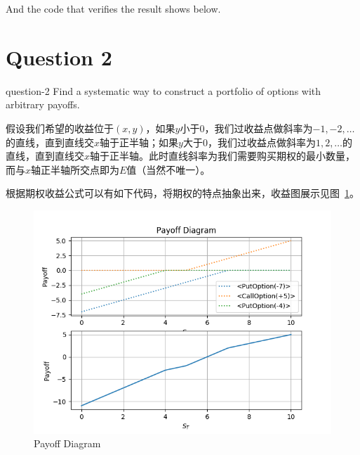 And the code that verifies the result shows below.



\section{Question 2}
\begin{statebox}{}{question-2}
    Find a systematic way to construct a portfolio of options with arbitrary payoffs.
\end{statebox}
假设我们希望的收益位于$(x,y)$，如果$y$小于0，我们过收益点做斜率为$-1,-2,\ldots$的直线，直到直线交$x$轴于正半轴；如果$y$大于0，我们过收益点做斜率为$1,2,\ldots$的直线，直到直线交$x$轴于正半轴。此时直线斜率为我们需要购买期权的最小数量，而与$x$轴正半轴所交点即为$E$值（当然不唯一）。

根据期权收益公式可以有如下代码，将期权的特点抽象出来，收益图展示见图~\ref{F:payoff-diagram-2}。
\begin{figure}[H]
    \centering
    \includegraphics[width=.7\textwidth]{figures/2019-09-27-payoff-diagram-2.png}
    \caption{Payoff Diagram}\label{F:payoff-diagram-2}
\end{figure}



